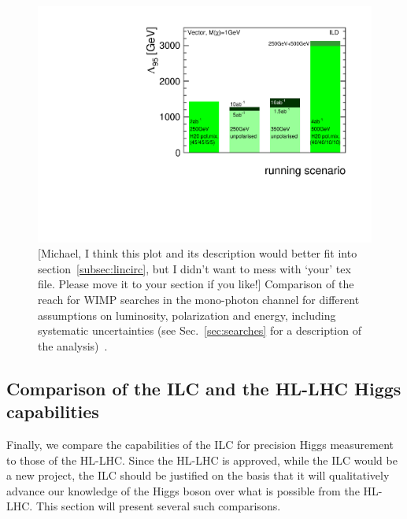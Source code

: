 \begin{figure}
\centering
\includegraphics[width=0.95\linewidth]{./chapters/figures/manhattan_vector_v3.pdf}
		
\caption{{\color{red}[Michael, I think this plot and its description would better fit into section~\ref{subsec:lincirc}, but I didn't want to mess with `your' tex file. Please move it to your section if you like!]} Comparison of the reach for WIMP searches in the mono-photon channel for different assumptions on luminosity, polarization and energy, including systematic uncertainties (see Sec.~\ref{sec:searches} for a description of the analysis)~\cite{Habermehl:417605}. }
\label{fig:polWIMPmanhattans}
\end{figure}



\subsection{Comparison of the ILC and the HL-LHC Higgs capabilities}
\label{subsec:higgs:ilclhc}





Finally, we compare the capabilities of the ILC for precision Higgs
measurement to those of the HL-LHC.  Since the HL-LHC is approved,
while the ILC would be a new project, the ILC should be justified on
the basis that it will qualitatively advance our knowledge of the Higgs
boson over what is possible from the HL-LHC.  
This section will present several such comparisons.


